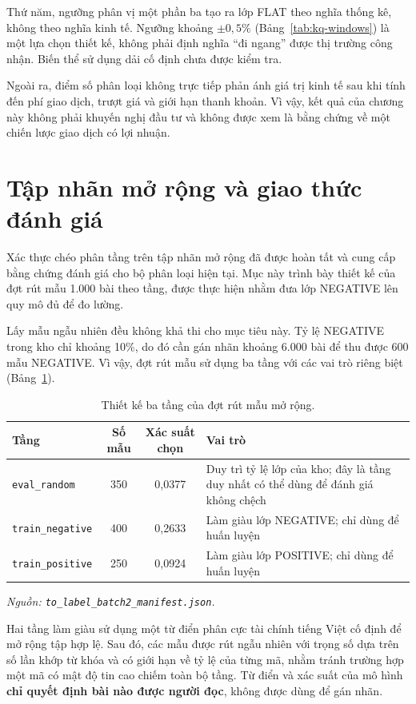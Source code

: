 \documentclass[12pt, a4paper, oneside]{report}
\begin{document}
Thứ năm, ngưỡng phân vị một phần ba tạo ra lớp FLAT theo nghĩa thống kê, không theo nghĩa
kinh tế. Ngưỡng khoảng $\pm0{,}5\%$ (Bảng~\ref{tab:kq-windows}) là một lựa chọn thiết kế,
không phải định nghĩa ``đi ngang'' được thị trường công nhận. Biến thể sử dụng dải cố định
chưa được kiểm tra.

Ngoài ra, điểm số phân loại không trực tiếp phản ánh giá trị kinh tế sau khi tính đến phí
giao dịch, trượt giá và giới hạn thanh khoản. Vì vậy, kết quả của chương này không phải
khuyến nghị đầu tư và không được xem là bằng chứng về một chiến lược giao dịch có lợi
nhuận.
\section{Tập nhãn mở rộng và giao thức đánh giá}
\label{sec:kq-mornhan}

Xác thực chéo phân tầng trên tập nhãn mở rộng đã được hoàn tất và cung cấp bằng chứng đánh giá cho bộ phân loại hiện tại. Mục này trình bày thiết kế của đợt rút mẫu 1.000 bài theo tầng, được thực hiện nhằm đưa lớp NEGATIVE lên quy mô đủ để đo lường.

Lấy mẫu ngẫu nhiên đều không khả thi cho mục tiêu này. Tỷ lệ NEGATIVE trong kho chỉ khoảng 10\%, do đó cần gán nhãn khoảng 6.000 bài để thu được 600 mẫu NEGATIVE. Vì vậy, đợt rút mẫu sử dụng ba tầng với các vai trò riêng biệt (Bảng~\ref{tab:kq-strata}).

\begin{table}[H]
  \centering
  \caption{Thiết kế ba tầng của đợt rút mẫu mở rộng.}
  \label{tab:kq-strata}
  \begin{tabular}{p{3.0cm} c c p{5.2cm}}
    \toprule
    Tầng & Số mẫu & Xác suất chọn & Vai trò \\
    \midrule
    \texttt{eval\_random} & 350 & 0,0377 & Duy trì tỷ lệ lớp của kho; đây là tầng duy nhất có thể dùng để đánh giá không chệch \\
    \texttt{train\_negative} & 400 & 0,2633 & Làm giàu lớp NEGATIVE; chỉ dùng để huấn luyện \\
    \texttt{train\_positive} & 250 & 0,0924 & Làm giàu lớp POSITIVE; chỉ dùng để huấn luyện \\
    \bottomrule
  \end{tabular}
\noindent\textit{Nguồn: \texttt{to\_label\_batch2\_manifest.json}.}
\end{table}

Hai tầng làm giàu sử dụng một từ điển phân cực tài chính tiếng Việt cố định để mở rộng tập hợp lệ. Sau đó, các mẫu được rút ngẫu nhiên với trọng số dựa trên số lần khớp từ khóa và có giới hạn về tỷ lệ của từng mã, nhằm tránh trường hợp một mã có mật độ tin cao chiếm toàn bộ tầng. Từ điển và xác suất của mô hình \textbf{chỉ quyết định bài nào được người đọc}, không được dùng để gán nhãn.
\end{document}
